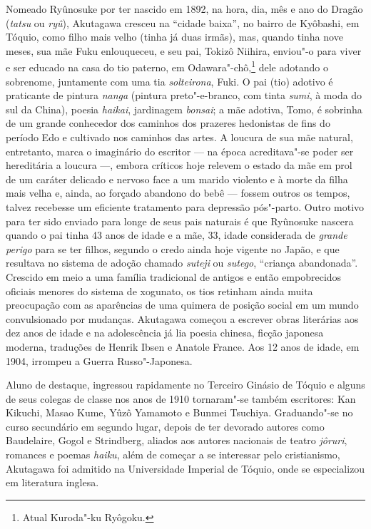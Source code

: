 Nomeado Ryûnosuke por ter nascido em 1892, na hora, dia, mês e ano do
Dragão (\textit{tatsu} ou \textit{ryû}), Akutagawa cresceu na ``cidade
baixa'', no bairro de Kyôbashi, em Tóquio, como filho mais velho
(tinha já duas irmãs), mas, quando tinha nove meses, sua mãe Fuku
enlouqueceu, e seu pai, Tokizô Niihira, enviou"-o para viver e ser
educado na casa do tio paterno, em Odawara"-chô,\footnote{Atual Kuroda"-ku
Ryôgoku.} dele adotando o sobrenome, juntamente com uma tia \textit{solteirona},
Fuki. O pai (tio) adotivo é praticante de pintura \textit{nanga} 
(pintura preto"-e-branco, com tinta \textit{sumi}, à moda do 
sul da China), poesia \textit{haikai}, jardinagem \textit{bonsai}; a
mãe adotiva, Tomo, é sobrinha de um grande conhecedor dos caminhos dos
prazeres hedonistas de fins do período Edo e cultivado nos caminhos das
artes. A loucura de sua mãe natural, entretanto, marca o imaginário do
escritor --- na época acreditava"-se poder ser hereditária a loucura ---,
embora críticos hoje relevem o estado da mãe em prol de um caráter
delicado e nervoso  face a um marido violento e à morte da filha mais
velha e, ainda, ao forçado abandono do bebê --- fossem outros os tempos,
talvez recebesse um eficiente tratamento para depressão pós"-parto.
Outro motivo para ter sido enviado para longe de seus pais naturais é
que Ryûnosuke nascera quando o pai tinha 43 anos de idade e a mãe, 33,
idade considerada de \textit{grande perigo} para se ter filhos, segundo o credo 
ainda hoje vigente no Japão, e que resultava no sistema de adoção chamado \textit{suteji} ou
\textit{sutego}, ``criança abandonada''. Crescido em meio a uma família
tradicional de antigos e então empobrecidos oficiais menores do sistema
de xogunato, os tios retinham ainda muita preocupação com as aparências de
uma quimera de posição social em um mundo convulsionado por mudanças.
Akutagawa começou a escrever obras literárias aos dez anos de idade e na
adolescência já lia poesia chinesa, ficção japonesa moderna, traduções
de Henrik Ibsen e Anatole France. Aos 12 anos de idade, em 1904,
irrompeu a Guerra Russo"-Japonesa.

Aluno de destaque, ingressou rapidamente no Terceiro Ginásio de Tóquio e 
alguns de seus colegas de classe nos anos de 1910 tornaram"-se
também escritores: Kan Kikuchi, Masao Kume, Yûzô Yamamoto e Bunmei Tsuchiya. 
Graduando"-se no curso secundário em segundo lugar, depois de
ter devorado autores como Baudelaire, Gogol e Strindberg, aliados aos
autores nacionais de teatro \textit{jôruri}, romances e poemas
\textit{haiku}, além de começar a se interessar pelo cristianismo,
Akutagawa foi admitido na Universidade Imperial de Tóquio, onde se
especializou em literatura inglesa.

